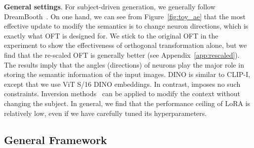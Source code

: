 \begin{itemize}[leftmargin=*,nosep]
\begin{itemize}[leftmargin=*,nosep]
\textbf{General settings}. For subject-driven generation, we generally follow DreamBooth~\cite{ruiz2023dreambooth}. On one hand, we can see from Figure~\ref{fig:toy_ae} that the most effective update to modify the semantics is to change neuron directions, which is exactly what OFT is designed for. We stick to the original OFT in the experiment to show the effectiveness of orthogonal transformation alone, but we find that the re-scaled OFT is generally better (see Appendix~\ref{app:rescaled}). The results imply that the angles (directions) of neurons play the major role in storing the semantic information of the input images. DINO is similar to CLIP-I, except that we use ViT S/16 DINO embeddings. In contrast, \cite{liu2021orthogonal} imposes no such constraints. Inversion methods~\cite{choi2021ilvr,dhariwal2021diffusion,ramesh2022hierarchical,gal2022image} can be applied to modify the context without changing the subject. In general, we find that the performance ceiling of LoRA is relatively low, even if we have carefully tuned its hyperparameters. \subsection{General Framework}


\end{itemize}
\end{itemize}
